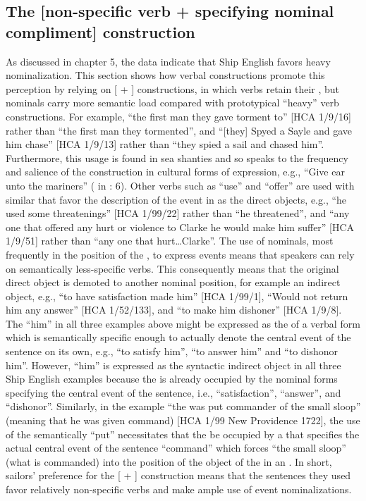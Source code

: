 \subsection{{The [non-specific verb + specifying nominal compliment] construction}}\label{sec:6.1.1}

As discussed in chapter 5, the data indicate that Ship English favors heavy nominalization. This section shows how verbal constructions promote this perception by relying on [ + ] constructions, in which  verbs retain their , but nominals carry more semantic load compared with prototypical “heavy” verb constructions.  For example, “the first man they gave torment to” [HCA 1/9/16] rather than “the first man they tormented”, and “[they] Spyed a Sayle and gave him chase” [HCA 1/9/13] rather than “they spied a sail and chased him”. Furthermore, this usage is found in sea shanties and so speaks to the frequency and salience of the construction in cultural forms of expression, e.g., “Give ear unto the mariners” ( in \citealt{Hugill1969}: 6). Other verbs such as “use” and “offer” are used with similar  that favor the description of the event in  as the direct objects, e.g., “he used some threatenings” [HCA 1/99/22] rather than “he threatened”, and “any one that offered any hurt or violence to Clarke he would make him suffer” [HCA 1/9/51] rather than “any one that hurt…Clarke”. The use of nominals, most frequently in the position of the , to express events means that speakers can rely on semantically less-specific verbs. This consequently means that the original direct object is demoted to another nominal position, for example an indirect object, e.g., “to have satisfaction made him” [HCA 1/99/1], “Would not return him any answer” [HCA 1/52/133], and “to make him dishoner” [HCA 1/9/8]. The  “him” in all three examples above might be expressed as the  of a verbal form which is semantically specific enough to actually denote the central event of the sentence on its own, e.g., “to satisfy him”, “to answer him” and “to dishonor him”. However,  “him” is expressed as the syntactic indirect object in all three Ship English examples because the  is already occupied by the nominal forms specifying the central event of the sentence, i.e., “satisfaction”, “answer”, and “dishonor”. Similarly, in the example “the  was put commander of the small sloop” (meaning that he was given command) [HCA 1/99 New Providence 1722], the use of the semantically  “put” necessitates that the  be occupied by a  that specifies the actual central event of the sentence “command” which forces “the small sloop” (what is commanded) into the position of the object of the  in an . In short, sailors’ preference for the [ + ] construction means that the sentences they used favor relatively non-specific verbs and make ample use of event nominalizations. 

